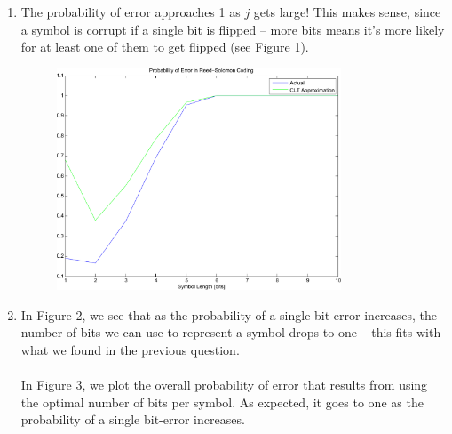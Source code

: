 \documentclass[11pt]{article}
\begin{document}
\begin{enumerate}
\begin{enumerate}
        \item
            The probability of error approaches 1 as $j$ gets large! This makes sense, since a symbol is corrupt if a single bit is flipped -- more bits means it's more likely for at least one of them to get flipped (see Figure 1).

             \begin{figure}[H]
                \begin{center}
                    \includegraphics[width = 0.8\textwidth]{q1d.pdf}
                    \caption{}
                \end{center}
            \end{figure}



        \item
            In Figure 2, we see that as the probability of a single bit-error increases, the number of bits we can use to represent a symbol drops to one -- this fits with what we found in the previous question. \\
            \\
            In Figure 3, we plot the overall probability of error that results from using the optimal number of bits per symbol. As expected, it goes to one as the probability of a single bit-error increases.




\end{enumerate}
\end{enumerate}
\end{document}
